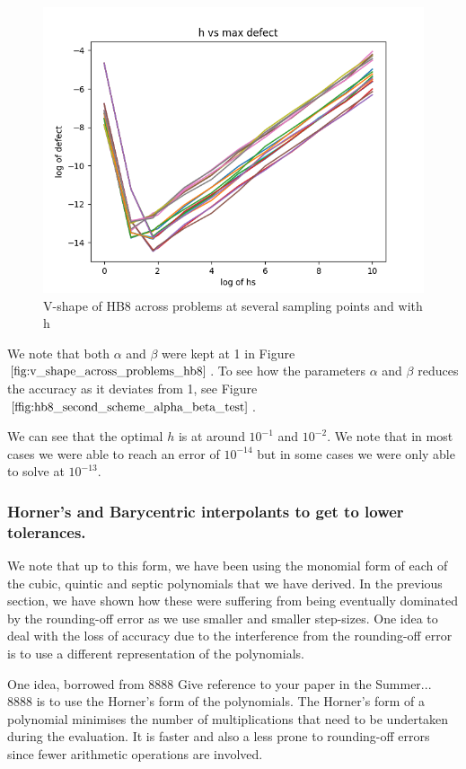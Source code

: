\documentclass{article}
\begin{document}
\begin{figure}[H]
\centering
\includegraphics[width=0.7\linewidth]{./figures/v_shape_across_problems_hb8}
\caption{V-shape of HB8 across problems at several sampling points and with h}
\label{fig:v_shape_across_problems_hb8}
\end{figure}

We note that both $\alpha$ and $\beta$ were kept at 1 in Figure $\ref{fig:v_shape_across_problems_hb8}$. To see how the parameters $\alpha$ and $\beta$ reduces the accuracy as it deviates from 1, see Figure $\ref{ffig:hb8_second_scheme_alpha_beta_test}$.

We can see that the optimal $h$ is at around $10^{-1}$ and $10^{-2}$. We note that in most cases we were able to reach an error of $10^{-14}$ but in some cases we were only able to solve at $10^{-13}$. 

\subsubsection{Horner's and Barycentric interpolants to get to lower tolerances.}
We note that up to this form, we have been using the monomial form of each of the cubic, quintic and septic polynomials that we have derived. In the previous section, we have shown how these were suffering from being eventually dominated by the rounding-off error as we use smaller and smaller step-sizes. One idea to deal with the loss of accuracy due to the interference from the rounding-off error is to use a different representation of the polynomials. 

One idea, borrowed from 8888 Give reference to your paper in the Summer... 8888 is to use the Horner's form of the polynomials. The Horner's form of a polynomial minimises the number of multiplications that need to be undertaken during the evaluation. It is faster and also a less prone to rounding-off errors since fewer arithmetic operations are involved.
\end{document}
